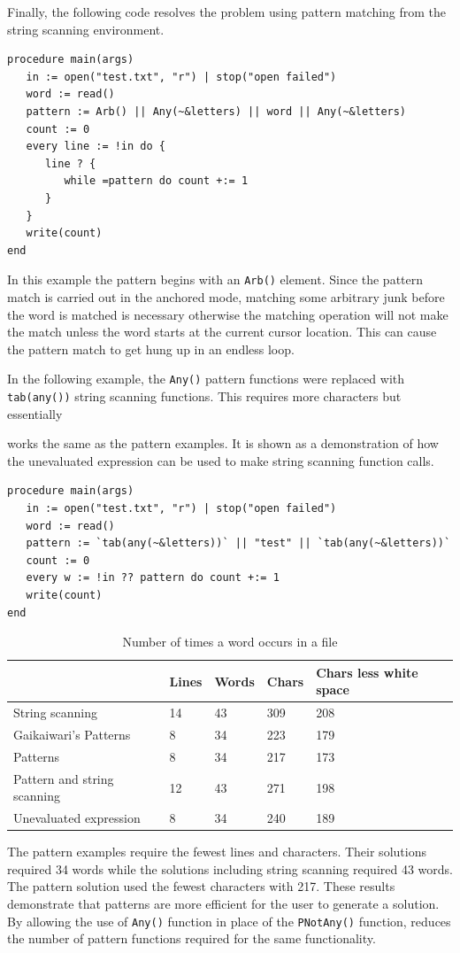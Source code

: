 \documentclass{article}
\begin{document}
Finally, the following code resolves the problem using pattern matching from the string scanning environment.\\
\begin{verbatim}
procedure main(args)
   in := open("test.txt", "r") | stop("open failed")
   word := read()
   pattern := Arb() || Any(~&letters) || word || Any(~&letters)
   count := 0
   every line := !in do {
      line ? {
         while =pattern do count +:= 1
      }
   }
   write(count)
end
\end{verbatim}
In this example the pattern begins with an \texttt{Arb()} element.  Since the pattern match is carried out in the anchored mode, matching some arbitrary junk before the word is matched is necessary otherwise the matching operation will not make the match unless the word starts at the current cursor location.  This can cause the pattern match to get hung up in an endless loop.

In the following example, the \texttt{Any()} pattern functions were replaced with \texttt{tab(any())} string scanning functions.  This requires more characters but essentially 

\pagebreak \noindent
works the same as the pattern examples.  It is shown as a demonstration of how the unevaluated expression can be used to make string scanning function calls.\\
\begin{verbatim}
procedure main(args)
   in := open("test.txt", "r") | stop("open failed")
   word := read()
   pattern := `tab(any(~&letters))` || "test" || `tab(any(~&letters))`
   count := 0
   every w := !in ?? pattern do count +:= 1
   write(count)
end
\end{verbatim}

\begin{table}[ht]
	\caption{Number of times a word occurs in a file}
	\centering
	\begin{tabular}{|l|l|l|l|l|}
		\hline\hline
		 & Lines & Words & Chars & Chars less white space\\
		\hline
		String scanning & 14 & 43 & 309 & 208 \\
		Gaikaiwari's Patterns & 8 & 34 & 223 & 179 \\
		Patterns & 8 & 34 & 217 & 173 \\
		Pattern and string scanning & 12 & 43 & 271 & 198 \\
		Unevaluated expression & 8 & 34 & 240 & 189 \\
		\hline
	\end{tabular}
\end{table}
The pattern examples require the fewest lines and characters.  Their solutions required 34 words while the solutions including string scanning required 43 words.  The pattern solution used the fewest characters with 217.  These results demonstrate that patterns are more efficient for the user to generate a solution.  By allowing the use of \texttt{Any()} function in place of the \texttt{PNotAny()} function, reduces the number of pattern functions required for the same functionality.
\end{document}

